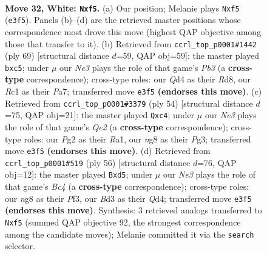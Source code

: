 \documentclass[11pt]{article}
\begin{document}
\clearpage

\begin{figure}[p]\centering
\begin{subfigure}{0.46\textwidth}\centering
\resizebox{\linewidth}{!}{%
\newchessgame
\chessboard[
  setfen={4k1nr/1b2q3/8/r3Pp2/3Q3p/1p1BN2P/6P1/2R3KR w - - 4 32},
  showmover=false,
  pgfstyle=straightmove, color=movearrow, markmove={e3-f5}
]}
\caption{}
\end{subfigure}\hfill
\begin{subfigure}{0.46\textwidth}\centering
\resizebox{\linewidth}{!}{%
\newchessgame
\chessboard[
  setfen={3r2k1/p3q1p1/1p4b1/2Pp4/P6P/6P1/1P1Q1RBK/8 b - - 0 35},
  showmover=false,
  pgfstyle=straightmove, color=movearrow, markmove={b6-c5}
]}
\caption{}
\end{subfigure}
\\[4pt]
\begin{subfigure}{0.46\textwidth}\centering
\resizebox{\linewidth}{!}{%
\newchessgame
\chessboard[
  setfen={B6k/6p1/1q2rp1p/2b4P/p1p5/6P1/1P2QP2/R5K1 w - - 0 28},
  showmover=false,
  pgfstyle=straightmove, color=movearrow, markmove={e2-c4}
]}
\caption{}
\end{subfigure}\hfill
\begin{subfigure}{0.46\textwidth}\centering
\resizebox{\linewidth}{!}{%
\newchessgame
\chessboard[
  setfen={1r4k1/4bp1p/p5p1/3p2P1/1qBQ3P/5P2/PP6/1K1R4 w - - 0 29},
  showmover=false,
  pgfstyle=straightmove, color=movearrow, markmove={c4-d5}
]}
\caption{}
\end{subfigure}
\caption{\textbf{Move 32, White: \texttt{Nxf5}.} (a) Our position; Melanie plays \texttt{Nxf5} (\texttt{e3f5}). Panels (b)--(d) are the retrieved master positions whose correspondence most drove this move (highest QAP objective among those that transfer to it). (b) Retrieved from \texttt{ccrl\_top\_p0001\#1442} (ply 69) [structural distance $d$=59, QAP obj=59]: the master played \texttt{bxc5}; under $\mu$ our \emph{Ne3} plays the role of that game's \emph{Pb3} (a \textbf{cross-type} correspondence); cross-type roles: our \emph{Q}d4 as their \emph{R}d8, our \emph{R}c1 as their \emph{P}a7; transferred move \texttt{e3f5} \textbf{(endorses this move)}. (c) Retrieved from \texttt{ccrl\_top\_p0001\#3379} (ply 54) [structural distance $d$=75, QAP obj=21]: the master played \texttt{Qxc4}; under $\mu$ our \emph{Ne3} plays the role of that game's \emph{Qe2} (a \textbf{cross-type} correspondence); cross-type roles: our \emph{P}g2 as their \emph{R}a1, our \emph{n}g8 as their \emph{P}g3; transferred move \texttt{e3f5} \textbf{(endorses this move)}. (d) Retrieved from \texttt{ccrl\_top\_p0001\#519} (ply 56) [structural distance $d$=76, QAP obj=12]: the master played \texttt{Bxd5}; under $\mu$ our \emph{Ne3} plays the role of that game's \emph{Bc4} (a \textbf{cross-type} correspondence); cross-type roles: our \emph{n}g8 as their \emph{P}f3, our \emph{B}d3 as their \emph{Q}d4; transferred move \texttt{e3f5} \textbf{(endorses this move)}. Synthesis: 3 retrieved analogs transferred to \texttt{Nxf5} (summed QAP objective 92, the strongest correspondence among the candidate moves); Melanie committed it via the \texttt{search} selector.}
\label{fig:thought-m62}
\end{figure}
\end{document}
